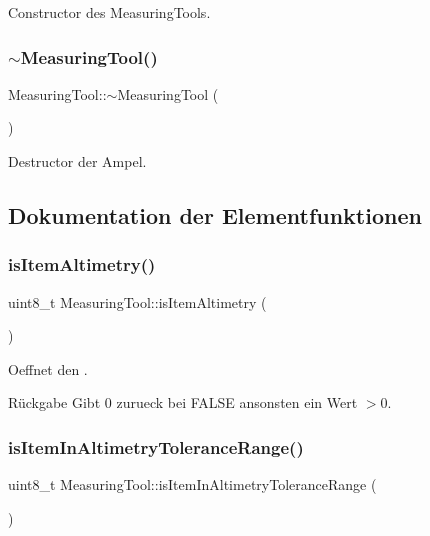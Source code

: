 Constructor des Measuring\+Tools. \hypertarget{class_measuring_tool_a35667285cd41bda48fcc747194c862cd}{}\label{class_measuring_tool_a35667285cd41bda48fcc747194c862cd} 
\subsubsection{\texorpdfstring{$\sim$\+Measuring\+Tool()}{~MeasuringTool()}}
{\footnotesize\ttfamily Measuring\+Tool\+::$\sim$\+Measuring\+Tool (\begin{DoxyParamCaption}{ }\end{DoxyParamCaption})\hspace{0.3cm}{\ttfamily [virtual]}}

Destructor der Ampel. 

\subsection{Dokumentation der Elementfunktionen}
\hypertarget{class_measuring_tool_aebbb332d935cadef3c072ca7102896d3}{}\label{class_measuring_tool_aebbb332d935cadef3c072ca7102896d3} 
\subsubsection{\texorpdfstring{is\+Item\+Altimetry()}{isItemAltimetry()}}
{\footnotesize\ttfamily uint8\+\_\+t Measuring\+Tool\+::is\+Item\+Altimetry (\begin{DoxyParamCaption}{ }\end{DoxyParamCaption})}

Oeffnet den .

\begin{DoxyReturn}{Rückgabe}
Gibt 0 zurueck bei F\+A\+L\+SE ansonsten ein Wert $>$0. 
\end{DoxyReturn}
\hypertarget{class_measuring_tool_a431263df5654d0dc1587ef23e97c1392}{}\label{class_measuring_tool_a431263df5654d0dc1587ef23e97c1392} 
\subsubsection{\texorpdfstring{is\+Item\+In\+Altimetry\+Tolerance\+Range()}{isItemInAltimetryToleranceRange()}}
{\footnotesize\ttfamily uint8\+\_\+t Measuring\+Tool\+::is\+Item\+In\+Altimetry\+Tolerance\+Range (\begin{DoxyParamCaption}{ }\end{DoxyParamCaption})}

